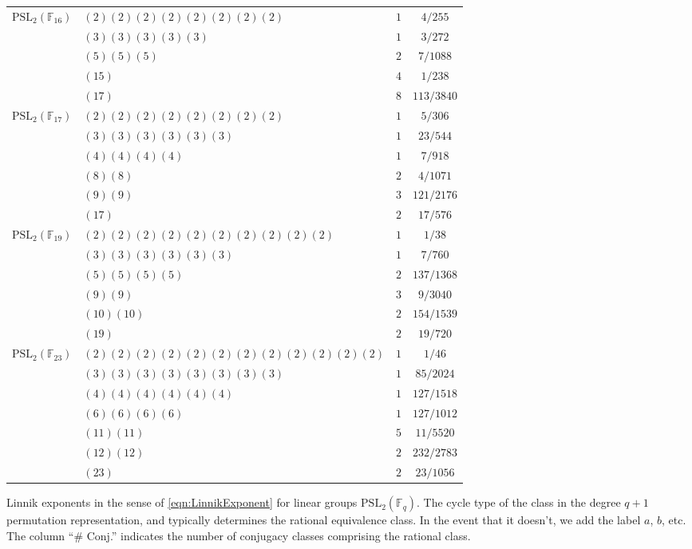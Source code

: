 \documentclass[12pt]{amsart}
\theoremstyle{definition} \newtheorem{definition}[theorem]{Definition}
\theoremstyle{example} \newtheorem{example}[theorem]{Example}
\theoremstyle{remark} \newtheorem{remark}{Remark}[theorem]
\numberwithin{equation}{section}
\numberwithin{theorem}{section}
\begin{document}
{\begin{table}[h]
\begin{minipage}[t]{0.45\textwidth}
\begin{tabular}{|l|l|c|c|}
			$\mathrm{PSL}_{2}(\mathbb{F}_{16})$ 
				& $(2)(2)(2)(2)(2)(2)(2)(2)$ & $1$ & $4/255$ \\
				& $(3)(3)(3)(3)(3)$ & $1$ & $3/272$ \\
				& $(5)(5)(5)$ & $2$ & $7/1088$ \\
				& $(15)$ & $4$ & $1/238$ \\
				& $(17)$ & $8$ & $113/3840$ \\ \hline
			$\mathrm{PSL}_2(\mathbb{F}_{17})$
				& $(2)(2)(2)(2)(2)(2)(2)(2)$ & $1$ & $5/306$ \\
				& $(3)(3)(3)(3)(3)(3)$ & $1$ & $23/544$ \\
				& $(4)(4)(4)(4)$ & $1$ & $7/918$ \\
				& $(8)(8)$ & $2$ & $4/1071$ \\
				& $(9)(9)$ & $3$ & $121/2176$ \\
				& $(17)$ & $2$ & $17/576$ \\ \hline
			$\mathrm{PSL}_2(\mathbb{F}_{19})$
				& $(2)(2)(2)(2)(2)(2)(2)(2)(2)(2)$ & $1$ & $1/38$ \\
				& $(3)(3)(3)(3)(3)(3)$ & $1$ & $7/760$ \\
				& $(5)(5)(5)(5)$ & $2$ & $137/1368$ \\
				& $(9)(9)$ & $3$ & $9/3040$ \\
				& $(10)(10)$ & $2$ & $154/1539$ \\
				& $(19)$ & $2$ & $19/720$ \\ \hline
			$\mathrm{PSL}_2(\mathbb{F}_{23})$ 
				& $(2)(2)(2)(2)(2)(2)(2)(2)(2)(2)(2)(2)$ & $1$ & $1/46$ \\
				& $(3)(3)(3)(3)(3)(3)(3)(3)$ & $1$ & $85/2024$ \\
				& $(4)(4)(4)(4)(4)(4)$ & $1$ & $127/1518$ \\
				& $(6)(6)(6)(6)$ & $1$ & $127/1012$ \\
				& $(11)(11)$ & $5$ & $11/5520$ \\
				& $(12)(12)$ & $2$ & $232/2783$ \\
				& $(23)$ & $2$ & $23/1056$ \\ \hline
		\end{tabular}
		\end{minipage}
		\begin{caption}{\label{tbl:simple-exponents-PSL2} Linnik exponents in the sense of \eqref{eqn:LinnikExponent} for linear groups $\mathrm{PSL}_2(\mathbb{F}_q)$.  The cycle type of the class in the degree $q+1$ permutation representation, and typically determines the rational equivalence class.  In the event that it doesn't, we add the label $a$, $b$, etc.  The column ``$\#$ Conj.'' indicates the number of conjugacy classes comprising the rational class.}\end{caption}
	\end{table}
	}
	
\clearpage




\end{document}
